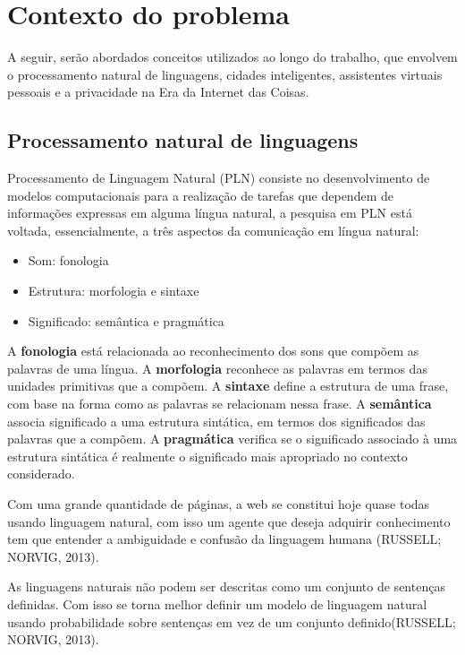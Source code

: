 \chapter{Contexto do problema} \label{c:contexto_do_problema}

A seguir, serão abordados conceitos utilizados ao longo do trabalho, que envolvem o processamento natural de linguagens, cidades inteligentes, assistentes virtuais pessoais e a  privacidade na Era da Internet das Coisas.

\section{Processamento natural de linguagens} \label{s:processamento_natural_de_linguagens}

Processamento de Linguagem Natural (PLN) consiste no desenvolvimento de modelos computacionais para a realização de tarefas que dependem de informações expressas em alguma língua natural, a pesquisa em PLN está voltada, essencialmente, a três aspectos da comunicação em língua natural:
\begin{itemize}
\item  Som: fonologia
\item  Estrutura: morfologia e sintaxe
\item  Significado: semântica e pragmática
\end{itemize}
A \textbf{fonologia} está relacionada ao reconhecimento dos sons que compõem as palavras de uma língua. A \textbf{morfologia} reconhece as palavras em termos das unidades primitivas que a compõem. A \textbf{sintaxe} define a estrutura de uma frase, com base na forma como as palavras se relacionam nessa frase.  A \textbf{semântica} associa significado a uma estrutura sintática, em termos dos significados das palavras que a compõem. A \textbf{pragmática} verifica se o significado associado à uma estrutura sintática é realmente o significado mais apropriado no contexto considerado.

Com uma grande quantidade de páginas, a web se constitui hoje quase todas usando linguagem natural, com isso um agente que deseja adquirir conhecimento tem que entender a ambiguidade e confusão da linguagem humana (RUSSELL; NORVIG, 2013).

As linguagens naturais não podem ser descritas como um conjunto de sentenças definidas. Com isso se torna melhor definir um modelo de linguagem natural usando probabilidade sobre sentenças em vez de um conjunto definido(RUSSELL; NORVIG, 2013).

